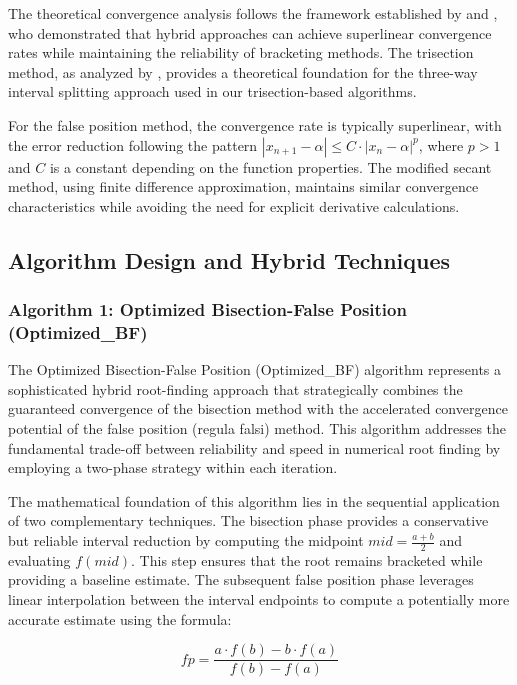 \documentclass[amsmath, amssymb, aps]{revtex4-2}
\begin{document}
The theoretical convergence analysis follows the framework established by \cite{sabharwal2019blended} and \cite{badr2022novel}, who demonstrated that hybrid approaches can achieve superlinear convergence rates while maintaining the reliability of bracketing methods. The trisection method, as analyzed by \cite{demir2008trisection}, provides a theoretical foundation for the three-way interval splitting approach used in our trisection-based algorithms.

For the false position method, the convergence rate is typically superlinear, with the error reduction following the pattern $|x_{n+1} - \alpha| \leq C \cdot |x_n - \alpha|^p$, where $p > 1$ and $C$ is a constant depending on the function properties. The modified secant method, using finite difference approximation, maintains similar convergence characteristics while avoiding the need for explicit derivative calculations.

\subsection{Algorithm Design and Hybrid Techniques}

\subsubsection{Algorithm 1: Optimized Bisection-False Position (Optimized\_BF)}

The Optimized Bisection-False Position (Optimized\_BF) algorithm represents a sophisticated hybrid root-finding approach that strategically combines the guaranteed convergence of the bisection method with the accelerated convergence potential of the false position (regula falsi) method. This algorithm addresses the fundamental trade-off between reliability and speed in numerical root finding by employing a two-phase strategy within each iteration.

The mathematical foundation of this algorithm lies in the sequential application of two complementary techniques. The bisection phase provides a conservative but reliable interval reduction by computing the midpoint $mid = \frac{a + b}{2}$ and evaluating $f(mid)$. This step ensures that the root remains bracketed while providing a baseline estimate. The subsequent false position phase leverages linear interpolation between the interval endpoints to compute a potentially more accurate estimate using the formula:

\begin{equation}
fp = \frac{a \cdot f(b) - b \cdot f(a)}{f(b) - f(a)}
\end{equation}
\end{document}
